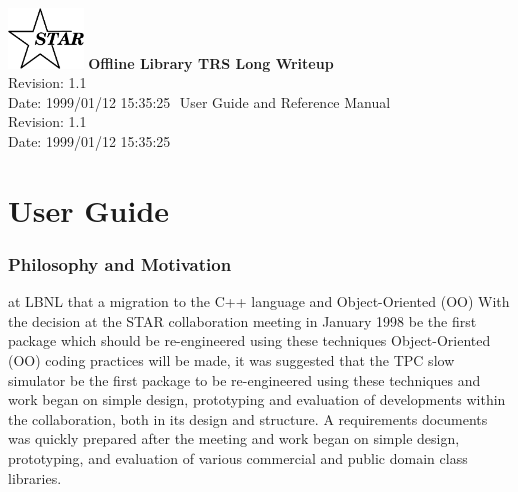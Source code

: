 \documentclass[twoside]{article}
\begin{document}
%
%
\begin{titlepage}
\pagestyle{empty}
\vspace*{-35mm}
\begin{center}
  \mbox{\includegraphics[width=2cm]{StarIcon.eps}}
  {\Large\bf Offline Library TRS Long Writeup}
  \hfill\mbox{}\\[3cm]
  {\LARGE $ $Revision: 1.1 $ $}  \\[5mm] %
  {\LARGE $ $Date: 1999/01/12 15:35:25 $ $}  %
  {\LARGE User Guide and Reference Manual}\\[2cm]
  {\LARGE $ $Revision: 1.1 $ $}  \\[5mm] %
  {\LARGE $ $Date: 1999/01/12 15:35:25 $ $}  %
  \vfill
\end{center}
\cleardoublepage
\end{titlepage}

%
%
\tableofcontents
\cleardoublepage

%
%
\part{User Guide}
\clearpage

\section{Philosophy and Motivation} 
at LBNL that a migration to the C++ language and Object-Oriented (OO)
With the decision at the STAR collaboration meeting in January 1998
be the first package which should be re-engineered using these techniques
Object-Oriented (OO)
coding practices will be made, it was suggested that the TPC slow simulator
be the first package to be re-engineered using these techniques
and work began on simple design, prototyping and evaluation of 
developments within the collaboration, both in its design and structure.  
A requirements documents was quickly prepared after the meeting
and work began on simple design, prototyping, and evaluation of 
various commercial and public domain class libraries.
\end{document}
